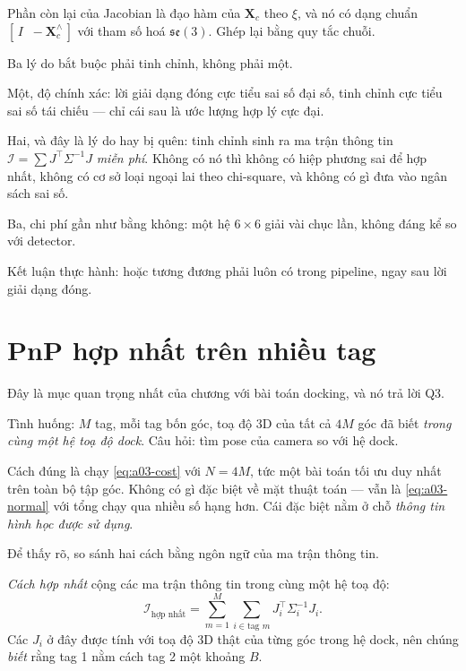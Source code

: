 \documentclass[../../marker.tex]{subfiles}
\begin{document}
Phần còn lại của Jacobian là đạo hàm của \(\mathbf{X}_c\) theo \(\xi\), và nó có dạng chuẩn \([\,I \;\; -\mathbf{X}_c^\wedge\,]\) với tham số hoá \(\mathfrak{se}(3)\). Ghép lại bằng quy tắc chuỗi.

\begin{cannho}
Ba lý do bắt buộc phải tinh chỉnh, không phải một.

Một, độ chính xác: lời giải dạng đóng cực tiểu sai số đại số, tinh chỉnh cực tiểu sai số tái chiếu --- chỉ cái sau là ước lượng hợp lý cực đại.

Hai, và đây là lý do hay bị quên: tinh chỉnh sinh ra ma trận thông tin \(\mathcal{I} = \sum J^\top\Sigma^{-1}J\) \emph{miễn phí}. Không có nó thì không có hiệp phương sai để hợp nhất, không có cơ sở loại ngoại lai theo chi-square, và không có gì đưa vào ngân sách sai số.

Ba, chi phí gần như bằng không: một hệ \(6\times6\) giải vài chục lần, không đáng kể so với detector.

Kết luận thực hành:  hoặc tương đương phải luôn có trong pipeline, ngay sau lời giải dạng đóng.
\end{cannho}

\section{PnP hợp nhất trên nhiều tag}

Đây là mục quan trọng nhất của chương với bài toán docking, và nó trả lời Q3.

Tình huống: \(M\) tag, mỗi tag bốn góc, toạ độ 3D của tất cả \(4M\) góc đã biết \emph{trong cùng một hệ toạ độ dock}. Câu hỏi: tìm pose của camera so với hệ dock.

Cách đúng là chạy \eqref{eq:a03-cost} với \(N = 4M\), tức một bài toán tối ưu duy nhất trên toàn bộ tập góc. Không có gì đặc biệt về mặt thuật toán --- vẫn là \eqref{eq:a03-normal} với tổng chạy qua nhiều số hạng hơn. Cái đặc biệt nằm ở chỗ \emph{thông tin hình học được sử dụng}.

Để thấy rõ, so sánh hai cách bằng ngôn ngữ của ma trận thông tin.

\emph{Cách hợp nhất} cộng các ma trận thông tin trong cùng một hệ toạ độ:
\[
\mathcal{I}_{\text{hợp nhất}} = \sum_{m=1}^{M}\sum_{i \in \text{tag } m} J_i^\top \Sigma_i^{-1} J_i .
\]
Các \(J_i\) ở đây được tính với toạ độ 3D thật của từng góc trong hệ dock, nên chúng \emph{biết} rằng tag 1 nằm cách tag 2 một khoảng \(B\).
\end{document}
